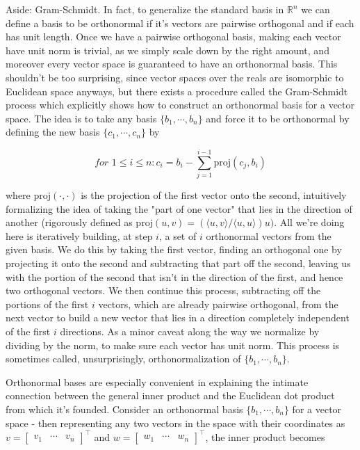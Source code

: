 \documentclass{article}
\newcommand{\n}{\leavevmode \newline}
\newcommand{\R}{\mathbb{R}}
\begin{document}
\n
\begin{adjustwidth}{1cm}{1cm}

	Aside: Gram-Schmidt. In fact, to generalize the standard basis in $ \R^n $ we can define a basis to be orthonormal if it's vectors are pairwise orthogonal and if each has unit length. Once we have a pairwise orthogonal basis, making each vector have unit norm is trivial, as we simply scale down by the right amount, and moreover every vector space is guaranteed to have an orthonormal basis. This shouldn't be too surprising, since vector spaces over the reals are isomorphic to Euclidean space anyways, but there exists a procedure called the Gram-Schmidt process which explicitly shows how to construct an orthonormal basis for a vector space. The idea is to take any basis $ \{ b_1, \cdots, b_n \} $ and force it to be orthonormal by defining the new basis $ \{ c_1, \cdots, c_n \} $ by

        $$ \textit{for } 1 \leq i \leq n: c_i = b_i - \sum_{j = 1}^{i - 1} \text{proj}(c_j, b_i) $$

    where $ \text{proj}(\cdot, \cdot) $ is the projection of the first vector onto the second, intuitively formalizing the idea of taking the "part of one vector" that lies in the direction of another (rigorously defined as $ \text{proj}(u, v) = (\langle u, v \rangle / \langle u, u \rangle) u) $. All we're doing here is iteratively building, at step $ i $, a set of $ i $ orthonormal vectors from the given basis. We do this by taking the first vector, finding an orthogonal one by projecting it onto the second and subtracting that part off the second, leaving us with the portion of the second that isn't in the direction of the first, and hence two orthogonal vectors. We then continue this process, subtracting off the portions of the first $ i $ vectors, which are already pairwise orthogonal, from the next vector to build a new vector that lies in a direction completely independent of the first $ i $ directions. As a minor caveat along the way we normalize by dividing by the norm, to make sure each vector has unit norm. This process is sometimes called, unsurprisingly, orthonormalization of $ \{ b_1, \cdots, b_n \} $.

\end{adjustwidth}
\n
Orthonormal bases are especially convenient in explaining the intimate connection between the general inner product and the Euclidean dot product from which it's founded. Consider an orthonormal basis $ \{ b_1, \cdots, b_n \} $ for a vector space - then representing any two vectors in the space with their coordinates as $ v = \begin{bmatrix} v_1 & \cdots & v_n \end{bmatrix}^\intercal $ and $ w = \begin{bmatrix} w_1 & \cdots & w_n \end{bmatrix}^\intercal $, the inner product becomes
\end{document}
